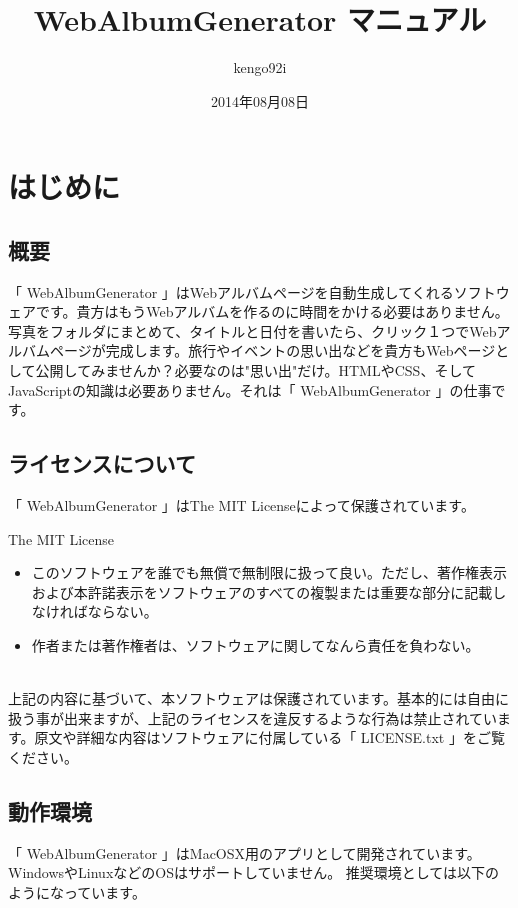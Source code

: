 \documentclass[]{jsarticle}
\title{WebAlbumGenerator マニュアル}
\author{kengo92i}
\date{2014年08月08日}
\begin{document}
\maketitle







\section{はじめに}

\subsection{概要}
「 WebAlbumGenerator 」はWebアルバムページを自動生成してくれるソフトウェアです。貴方はもうWebアルバムを作るのに時間をかける必要はありません。写真をフォルダにまとめて、タイトルと日付を書いたら、クリック１つでWebアルバムページが完成します。旅行やイベントの思い出などを貴方もWebページとして公開してみませんか？必要なのは"思い出"だけ。HTMLやCSS、そしてJavaScriptの知識は必要ありません。それは「 WebAlbumGenerator 」の仕事です。

\subsection{ライセンスについて}
「 WebAlbumGenerator 」はThe MIT Licenseによって保護されています。\\

\begin{itembox}[l]{The MIT License}
 \begin{itemize}
   \item このソフトウェアを誰でも無償で無制限に扱って良い。ただし、著作権表示および本許諾表示をソフトウェアのすべての複製または重要な部分に記載しなければならない。
   \item 作者または著作権者は、ソフトウェアに関してなんら責任を負わない。
 \end{itemize}
\end{itembox} \\

上記の内容に基づいて、本ソフトウェアは保護されています。基本的には自由に扱う事が出来ますが、上記のライセンスを違反するような行為は禁止されています。原文や詳細な内容はソフトウェアに付属している「 LICENSE.txt 」をご覧ください。

\subsection{動作環境}
「 WebAlbumGenerator 」はMacOSX用のアプリとして開発されています。WindowsやLinuxなどのOSはサポートしていません。
推奨環境としては以下のようになっています。\\
\end{document}
